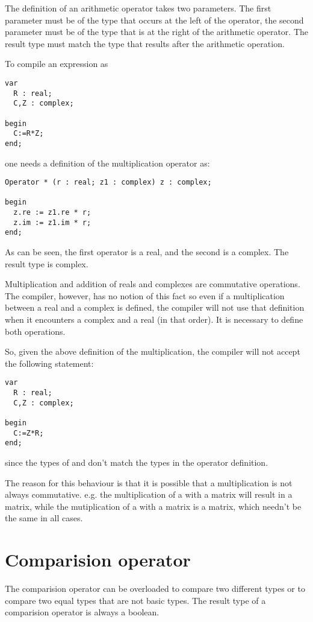 \documentclass{report}
\begin{document}
The definition of an arithmetic operator takes two parameters. The first
parameter must be of the type that occurs at the left of the operator, 
the second parameter must be of the type that is at the right of the
arithmetic operator. The result type must match the type that results
after the arithmetic operation.

To compile an expression as
\begin{verbatim}
var 
  R : real;
  C,Z : complex;

begin
  C:=R*Z;
end;
\end{verbatim}
one needs a definition of the multiplication operator as:
\begin{verbatim}
Operator * (r : real; z1 : complex) z : complex;
 
begin
  z.re := z1.re * r;
  z.im := z1.im * r;
end;
\end{verbatim}
As can be seen, the first operator is a real, and the second is
a complex. The result type is complex.

Multiplication and addition of reals and complexes are commutative 
operations. The compiler, however, has no notion of this fact so even 
if a multiplication between a real and a complex is defined, the 
compiler will not use that definition when it encounters a complex 
and a real (in that order). It is necessary to define both operations.

So, given the above definition of the multiplication, 
the compiler will not accept the following statement:
\begin{verbatim}
var 
  R : real;
  C,Z : complex;

begin
  C:=Z*R;
end;
\end{verbatim}
since the types of  and  don't match the types in the
operator definition.

The reason for this behaviour is that it is possible that a multiplication
is not always commutative. e.g. the multiplication of a  with a
 matrix will result in a  matrix, while the
mutiplication of a  with a  matrix is a 
matrix, which needn't be the same in all cases.

\section{Comparision operator}
The comparision operator can be overloaded to compare two different types
or to compare two equal types that are not basic types. The result type of
a comparision operator is always a boolean.
\end{document}
